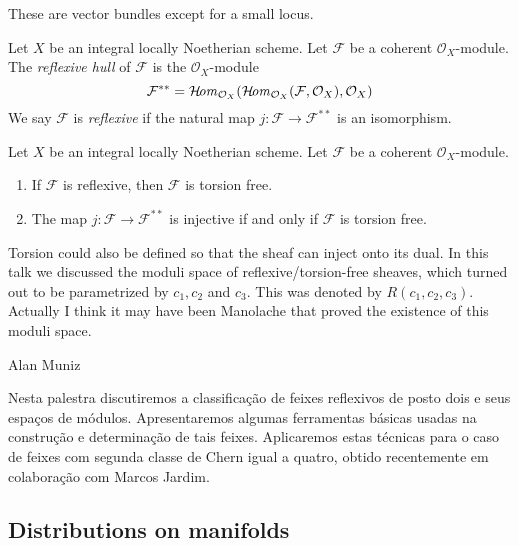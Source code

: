 \begin{slogan}
These are vector bundles except for a small locus.
\end{slogan}

\begin{definition}
\label{definition-reflexive}
Let $X$ be an integral locally Noetherian scheme. Let $\mathcal{F}$
be a coherent $\mathcal{O}_X$-module. The {\it reflexive hull}
of $\mathcal{F}$ is the $\mathcal{O}_X$-module
$$
\mathcal{F}^{**} = \mathop{\mathcal{H}\!\mathit{om}}\nolimits_{\mathcal{O}_X}(
\mathop{\mathcal{H}\!\mathit{om}}\nolimits_{\mathcal{O}_X}(\mathcal{F}, \mathcal{O}_X), \mathcal{O}_X)
$$
We say $\mathcal{F}$ is {\it reflexive} if the natural map
$j : \mathcal{F} \longrightarrow \mathcal{F}^{**}$
is an isomorphism.
\end{definition}

\begin{lemma}
\label{lemma-reflexive-torsion-free}
Let $X$ be an integral locally Noetherian scheme. Let $\mathcal{F}$
be a coherent $\mathcal{O}_X$-module.
\begin{enumerate}
\item If $\mathcal{F}$ is reflexive, then $\mathcal{F}$ is torsion free.
\item The map $j : \mathcal{F} \longrightarrow \mathcal{F}^{**}$
is injective if and only if $\mathcal{F}$ is torsion free.
\end{enumerate}
\end{lemma}

\begin{remark}\leavevmode
\label{remark-reflexive-talk}
Torsion could also be defined so that the sheaf can inject onto its dual. In
this talk we discussed the moduli space of reflexive/torsion-free sheaves, which
turned out to be parametrized by $c_1, c_2$ and $c_3$. This was denoted by 
$R(c_1,c_2,c_3)$. Actually I think it may have been Manolache that proved the
existence of this moduli space.


Alan Muniz

Nesta palestra discutiremos a classificação de feixes reflexivos de posto dois e
seus espaços de módulos. Apresentaremos algumas ferramentas básicas usadas na
construção e determinação de tais feixes. Aplicaremos estas técnicas para o caso
de feixes com segunda classe de Chern igual a quatro, obtido recentemente em
colaboração com Marcos Jardim.
\end{remark}

\subsection{Distributions on manifolds}
\label{subsection-distributions-on-manifolds}

